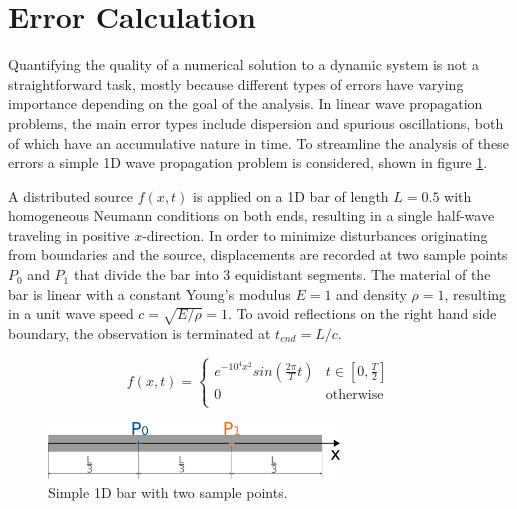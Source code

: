 %
\section{Error Calculation}
\label{section:error_calculation}
%

Quantifying the quality of a numerical solution to a dynamic system is not a straightforward task, mostly because different types of errors have varying importance depending on the goal of the analysis. In linear wave propagation problems, the main error types include dispersion and spurious oscillations, both of which have an accumulative nature in time. To streamline the analysis of these errors a simple 1D wave propagation problem is considered, shown in figure \ref{fig:toy_problem}.

A distributed source $f(x,t)$ is applied on a 1D bar of length $L=0.5$ with homogeneous Neumann conditions on both ends, resulting in a single half-wave traveling in positive $x$-direction. In order to minimize disturbances originating from boundaries and the source, displacements are recorded at two sample points $P_0$ and $P_1$ that divide the bar into 3 equidistant segments. The material of the bar is linear with a constant Young's modulus $E=1$ and density $\rho=1$, resulting in a unit wave speed $c=\sqrt{E / \rho}=1$. To avoid reflections on the right hand side boundary, the observation is terminated at $t_{end}=L/c$.

\begin{equation} \label{eq:toy_problem_source}
	f(x,t) = \begin{cases}
		e^{-10^4x^2} sin \left( \frac{2 \pi}{T} t \right) & t \in \left[ 0,\frac{T}{2} \right] \\
		0 & \text{otherwise} \\
	\end{cases}
\end{equation}

\begin{figure}[h]
	\centering
	\includegraphics[height=1.5cm]{pictures/figures/toy_problem.png}
	\caption{Simple 1D bar with two sample points.}
	\label{fig:toy_problem}
\end{figure}

